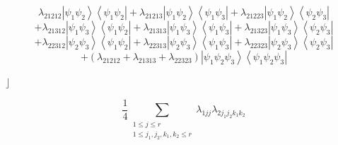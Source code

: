 \documentclass[aps,preprint]{revtex4}%
\begin{document}
%

\begin{equation}
\lambda_{21212}\left\vert \psi_{1}\psi_{2}\right\rangle \left\langle \psi
_{1}\psi_{2}\right\vert +\lambda_{21213}\left\vert \psi_{1}\psi_{2}%
\right\rangle \left\langle \psi_{1}\psi_{3}\right\vert +\lambda_{21223}%
\left\vert \psi_{1}\psi_{2}\right\rangle \left\langle \psi_{2}\psi
_{3}\right\vert
\end{equation}%
\begin{equation}
+\lambda_{21312}\left\vert \psi_{1}\psi_{3}\right\rangle \left\langle \psi
_{1}\psi_{2}\right\vert +\lambda_{21313}\left\vert \psi_{1}\psi_{3}%
\right\rangle \left\langle \psi_{1}\psi_{3}\right\vert +\lambda_{21323}%
\left\vert \psi_{1}\psi_{3}\right\rangle \left\langle \psi_{2}\psi
_{3}\right\vert
\end{equation}%
\begin{equation}
+\lambda_{22312}\left\vert \psi_{2}\psi_{3}\right\rangle \left\langle \psi
_{1}\psi_{2}\right\vert +\lambda_{22313}\left\vert \psi_{2}\psi_{3}%
\right\rangle \left\langle \psi_{1}\psi_{3}\right\vert +\lambda_{22323}%
\left\vert \psi_{2}\psi_{3}\right\rangle \left\langle \psi_{2}\psi
_{3}\right\vert
\end{equation}%
\begin{equation}
+\left(  \lambda_{21212}+\lambda_{21313}+\lambda_{22323}\right)  \left\vert
\psi_{1}\psi_{2}\psi_{3}\right\rangle \left\langle \psi_{1}\psi_{2}\psi
_{3}\right\vert
\end{equation}


\bigskip$\rfloor$%

\begin{equation}
\frac{1}{4}\sum_{\substack{1\leq j\leq r\\1\leq j_{1},j_{2},k_{1},k_{2}\leq
r}}\lambda_{1jj}\lambda_{2j_{1}j_{2}k_{1}k_{2}}%
\end{equation}
%
\end{document}
